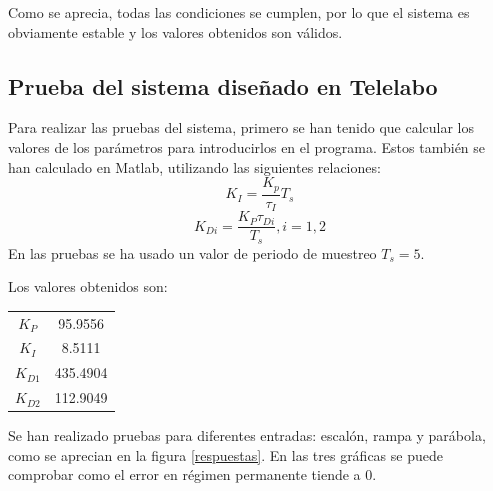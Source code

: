 \documentclass[a4paper]{article}
\begin{document}
Como se aprecia, todas las condiciones se cumplen, por lo que el sistema es obviamente estable y los valores obtenidos son válidos.

\subsection{Prueba del sistema diseñado en Telelabo \label{sec:pruebas}}
Para realizar las pruebas del sistema, primero se han tenido que calcular los valores de los parámetros para introducirlos en el programa. Estos también se han calculado en Matlab, utilizando las siguientes relaciones:
\begin{equation}
K_I=\frac{K_p}{\tau_I} T_s
\end{equation}
\begin{equation}
K_{Di}=\frac{K_P \tau_{Di}}{T_s}, i=1,2
\end{equation}
En las pruebas se ha usado un valor de periodo de muestreo $T_s=5$.

Los valores obtenidos son:
\begin{center}
	\begin{tabular}{c|c}
		$K_P$ & 95.9556 \\
		$K_I$ & 8.5111 \\
		$K_{D1}$ & 435.4904 \\
		$K_{D2}$ & 112.9049 \\
	\end{tabular}
\end{center}

Se han realizado pruebas para diferentes entradas: escalón, rampa y parábola, como se aprecian en la figura \ref{respuestas}.
En las tres gráficas se puede comprobar como el error en régimen permanente tiende a $0$.
\end{document}
